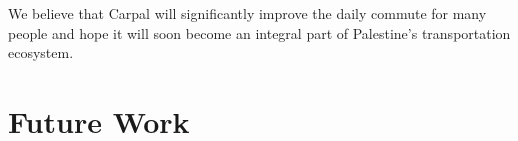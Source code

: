 \documentclass[a4paper, 12pt]{report} %
\begin{document}
        We believe that Carpal will significantly improve the daily commute for many people and hope it will soon become an integral part of Palestine's transportation ecosystem.
        
    \pagebreak
    \section{Future Work}



    \printbibliography
\end{document}
